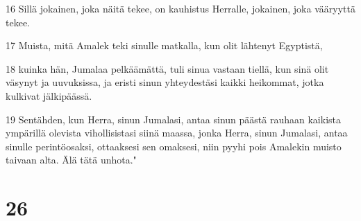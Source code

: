 \par 16 Sillä jokainen, joka näitä tekee, on kauhistus Herralle, jokainen, joka vääryyttä tekee.
\par 17 Muista, mitä Amalek teki sinulle matkalla, kun olit lähtenyt Egyptistä,
\par 18 kuinka hän, Jumalaa pelkäämättä, tuli sinua vastaan tiellä, kun sinä olit väsynyt ja uuvuksissa, ja eristi sinun yhteydestäsi kaikki heikommat, jotka kulkivat jälkipäässä.
\par 19 Sentähden, kun Herra, sinun Jumalasi, antaa sinun päästä rauhaan kaikista ympärillä olevista vihollisistasi siinä maassa, jonka Herra, sinun Jumalasi, antaa sinulle perintöosaksi, ottaaksesi sen omaksesi, niin pyyhi pois Amalekin muisto taivaan alta. Älä tätä unhota."

\chapter{26}

